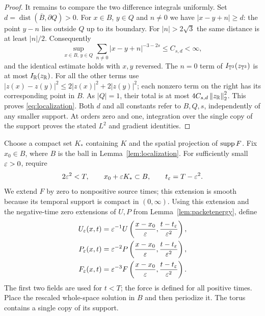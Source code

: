 \begin{proof}
It remains to compare the two difference integrals uniformly. Set
$d=\operatorname{dist}(\overline B,\partial Q)>0$.
For $x\in B$, $y\in Q$ and $n\ne0$ we have
$|x-y+n|\ge d$: the point $y-n$ lies outside $Q$ up to its boundary.
For $|n|>2\sqrt3$ the same distance is at least $|n|/2$.
Consequently
\[
 \sup_{x\in B,\,y\in Q}
 \sum_{n\ne0}|x-y+n|^{-3-2s}\le C_{s,d}<\infty,
\]
and the identical estimate holds with $x,y$ reversed. The $n=0$ term of
$I_{\mathbb T^3}(z_{\mathbb T^3})$ is at most $I_{\mathbb R}(z_{\mathbb R})$.
For all the other terms use
$|z(x)-z(y)|^2\le2|z(x)|^2+2|z(y)|^2$; each nonzero term on the right has
its corresponding point in $B$. As $|Q|=1$, their total is at most
$4C_{s,d}\left\lVert z_{\mathbb R}\right\rVert_2^2$.
This proves \eqref{eq:localization}. Both $d$ and all constants refer to
$B,Q,s$, independently of any smaller support. At orders zero and one,
integration over the single copy of the support proves the stated $L^2$
and gradient identities.
\end{proof}

Choose a compact set $K_*$ containing $K$ and the spatial projection of
$\operatorname{supp} F$. Fix $x_0\in B$, where $B$ is the ball in
Lemma~\ref{lem:localization}. For sufficiently small $\varepsilon>0$, require
\[
 2\varepsilon^2<T,\qquad x_0+\varepsilon K_*\subset B,
 \qquad t_\varepsilon=T-\varepsilon^2.
\]
We extend $F$ by zero to nonpositive source times; this extension is smooth
because its temporal support is compact in $(0,\infty)$. Using this
extension and the negative-time zero extensions of $U,P$ from
Lemma~\ref{lem:packetenergy}, define
\begin{align}
 U_\varepsilon(x,t)&=\varepsilon^{-1}U\left(\frac{x-x_0}{\varepsilon},
                              \frac{t-t_\varepsilon}{\varepsilon^2}\right),\nonumber\\
 P_\varepsilon(x,t)&=\varepsilon^{-2}P\left(\frac{x-x_0}{\varepsilon},
                              \frac{t-t_\varepsilon}{\varepsilon^2}\right),\label{eq:scaling}\\
 F_\varepsilon(x,t)&=\varepsilon^{-3}F\left(\frac{x-x_0}{\varepsilon},
                              \frac{t-t_\varepsilon}{\varepsilon^2}\right).\nonumber
\end{align}
The first two fields are used for $t<T$; the force is defined for all positive times. Place the rescaled whole-space solution in $B$ and then periodize it. The torus contains a single copy of its support.

